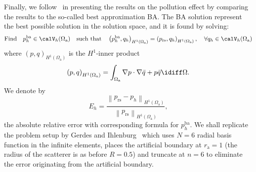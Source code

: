Finally, we follow~\cite{Gerdes1999otp} in presenting the results on the pollution effect by comparing the results to the so-called best approximation BA. The BA solution represent the best possible solution in the solution space, and it is found by solving:
\begin{equation*}
	\text{Find}\quad p_h^{\mathrm{ba}}\in \calV_h(\Omega_{\mathrm{a}})\quad \text{such that} \quad \left(p_h^{\mathrm{ba}},q_h\right)_{H^1(\Omega_{\mathrm{a}})} = \left(p_{\mathrm{rs}}, q_h\right)_{H^1(\Omega_{\mathrm{a}})},\quad \forall q_h\in\calV_h(\Omega_{\mathrm{a}})
\end{equation*}
where $\left(p,q\right)_{H^1(\Omega_{\mathrm{a}})}$ is the $H^1$-inner product
\begin{equation*}
	\left(p,q\right)_{H^1(\Omega_{\mathrm{a}})} = \int_{\Omega_{\mathrm{a}}}\nabla p\cdot\nabla \bar{q} + p \bar{q}\idiff\Omega.
\end{equation*}
We denote by
\begin{equation}\label{Eq2:H1relError}
	E_h = \frac{\left\|p_{\mathrm{rs}}-p_h\right\|_{H^1(\Omega_{\mathrm{a}})}}{\left\|p_{\mathrm{rs}}\right\|_{H^1(\Omega_{\mathrm{a}})}},
\end{equation}
the absolute relative error with corresponding formula for $p_h^{\mathrm{ba}}$. We shall replicate the problem setup by Gerdes and Ihlenburg~\cite{Gerdes1999otp} which uses $N=6$ radial basis function in the infinite elements, places the artificial boundary at $r_{\mathrm{a}} = 1$ (the radius of the scatterer is as before $R=0.5$) and truncate  at $n=6$ to eliminate the error originating from the artificial boundary.

